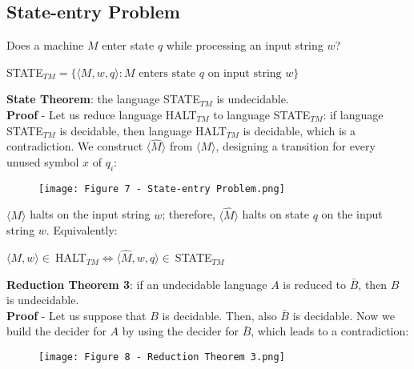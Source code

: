 \documentclass{article}
\begin{document}
\subsection{State-entry Problem}
Does a machine $M$ enter state $q$ while processing an input string $w$?
\begin{center}
    STATE$_{TM} = \{\langle M, w,q\rangle: M \text{ enters state } q \text{ on input string } w\}$
\end{center}
\vspace{0.2cm}
\textbf{State Theorem}: the language STATE$_{TM}$ is undecidable.
\vspace{0.1cm} \\
\textbf{Proof} - Let us reduce language HALT$_{TM}$ to language STATE$_{TM}$: if language STATE$_{TM}$ is decidable, then language HALT$_{TM}$ is decidable, which is a contradiction. We construct $\langle \hat{M} \rangle$ from $\langle M \rangle$, designing a transition for every unused symbol $x$ of $q_i$:
\begin{figure}[H]
    \centering
    \texttt{[image: Figure 7 - State-entry Problem.png]}
\end{figure}
\noindent
$\langle M \rangle$ halts on the input string $w$; therefore, $\langle \hat{M} \rangle$ halts on state $q$ on the input string $w$. Equivalently:
\begin{center}
    $\langle M, w \rangle \in \ $HALT$_{TM} \Longleftrightarrow \langle \hat{M}, w, q \rangle \in \ $STATE$_{TM}$
\end{center}
\vspace{0.2cm}
\textbf{Reduction Theorem 3}: if an undecidable language $A$ is reduced to $\bar{B}$, then $B$ is undecidable.
\vspace{0.1cm} \\
\textbf{Proof} - Let us suppose that $B$ is decidable. Then, also $\bar{B}$ is decidable. Now we build the decider for $A$ by using the decider for $\bar{B}$, which leads to a contradiction:
\begin{figure}[H]
    \centering
    \texttt{[image: Figure 8 - Reduction Theorem 3.png]}
\end{figure}
\end{document}
